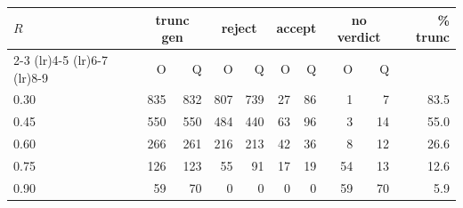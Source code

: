 \begin{tabular}{lrrrrrrrrr}
\toprule
\multirow{2}{*}{$R$} & \multicolumn{2}{c}{trunc gen} & \multicolumn{2}{c}{reject} & \multicolumn{2}{c}{accept} & \multicolumn{2}{c}{no verdict} & \multirow{2}{*}{\% trunc} \\
\cmidrule(lr){2-3} \cmidrule(lr){4-5} \cmidrule(lr){6-7} \cmidrule(lr){8-9}
 & O & Q & O & Q & O & Q & O & Q & \\
\midrule
0.30 & 835 & 832 & 807 & 739 & 27 & 86 & 1 & 7 & 83.5 \\
0.45 & 550 & 550 & 484 & 440 & 63 & 96 & 3 & 14 & 55.0 \\
0.60 & 266 & 261 & 216 & 213 & 42 & 36 & 8 & 12 & 26.6 \\
0.75 & 126 & 123 & 55 & 91 & 17 & 19 & 54 & 13 & 12.6 \\
0.90 & 59 & 70 & 0 & 0 & 0 & 0 & 59 & 70 & 5.9 \\
\bottomrule
\end{tabular}
